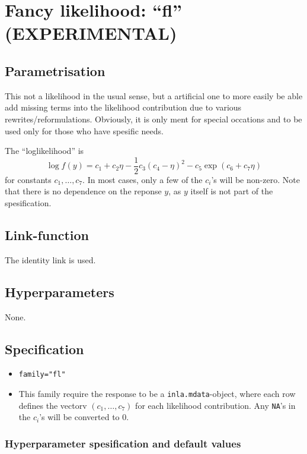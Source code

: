 \documentclass[a4paper,11pt]{article}
\begin{document}
\section*{Fancy likelihood: ``fl'' (EXPERIMENTAL)}

\subsection*{Parametrisation}

This not a likelihood in the usual sense, but a artificial one to more
easily be able add missing terms into the likelihood contribution due
to various rewrites/reformulations. Obviously, it is only ment for
special occations and to be used only for those who have spesific
needs.

The ``loglikelihood'' is
\begin{displaymath}
    \log f(y) = c_1 + c_2 \eta -\frac{1}{2} c_3 (c_4 - \eta)^{2} -
    c_5 \exp(c_6 + c_7 \eta)
\end{displaymath}
for constants $c_1, \ldots, c_7$. In most cases, only a few of the
$c_i$'s will be non-zero. Note that there is no dependence on the
reponse $y$, as $y$ itself is not part of the spesification.

\subsection*{Link-function}

The identity link is used.

\subsection*{Hyperparameters}

None.

\subsection*{Specification}

\begin{itemize}
\item \texttt{family="fl"}
\item This family require the response to be a
    \texttt{inla.mdata}-object, where each row defines the vectorv
    $(c_1, \ldots, c_7)$ for each likelihood contribution. Any
    \texttt{NA}'s in the $c_i$'s will be converted to 0.
\end{itemize}

\subsubsection*{Hyperparameter spesification and default values}
\end{document}
